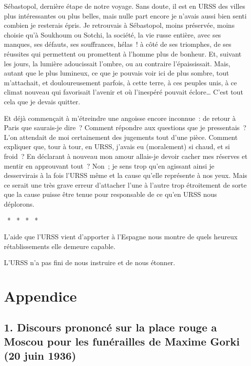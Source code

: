 \documentclass[french,twoside]{book} %
\newcommand\chapteropen{} %
\newcommand\chaptercont{} %
\newcommand\chapterclose{} %
\begin{document}
\chaptercont
\noindent Sébastopol, dernière étape de notre voyage. Sans doute, il est en URSS des villes plus intéressantes ou plus belles, mais nulle part encore je n’avais aussi bien senti combien je resterais épris. Je retrouvais à Sébastopol, moins préservée, moins choisie qu’à Soukhoum ou Sotchi, la société, la vie russe entière, avec ses manques, ses défauts, ses souffrances, hélas ! à côté de ses triomphes, de ses réussites qui permettent ou promettent à l’homme plus de bonheur. Et, suivant les jours, la lumière adoucissait l’ombre, ou au contraire l’épaississait. Mais, autant que le plus lumineux, ce que je pouvais voir ici de plus sombre, tout m’attachait, et douloureusement parfois, à cette terre, à ces peuples unis, à ce climat nouveau qui favorisait l’avenir et où l’inespéré pouvait éclore… C’est tout cela que je devais quitter.\par
Et déjà commençait à m’étreindre une angoisse encore inconnue : de retour à Paris que saurais-je dire ? Comment répondre aux questions que je pressentais ? L’on attendait de moi certainement des jugements tout d’une pièce. Comment expliquer que, tour à tour, en URSS, j’avais eu (moralement) si chaud, et si froid ? En déclarant à nouveau mon amour allais-je devoir cacher mes réserves et mentir en approuvant tout ? Non ; je sens trop qu’en agissant ainsi je desservirais à la fois l’URSS même et la cause qu’elle représente à nos yeux. Mais ce serait une très grave erreur d’attacher l’une à l’autre trop étroitement de sorte que la cause puisse être tenue pour responsable de ce qu’en URSS nous déplorons.\par
{\centering \noindent *  *  *  *  *\par}
\noindent L’aide que l’URSS vient d’apporter à l’Espagne nous montre de quels heureux rétablissements elle demeure capable.\par
L’URSS n’a pas fini de nous instruire et de nous étonner.
\chapterclose


\chapteropen

\chapter[{Appendice}]{Appendice}
\renewcommand{\leftmark}{Appendice}


\chaptercont

\section[{1. Discours prononcé sur la place rouge a Moscou pour les funérailles de Maxime Gorki (20 juin 1936)}]{1. Discours prononcé sur la place rouge a Moscou pour les funérailles de Maxime Gorki (20 juin 1936)}
\end{document}
